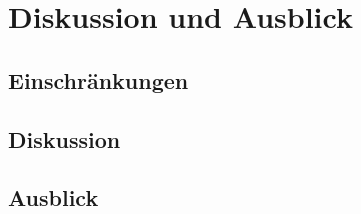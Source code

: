 \chapter{Diskussion und Ausblick}
\section{Einschränkungen}\label{Einschraenkungen}
\section{Diskussion}
\section{Ausblick}

